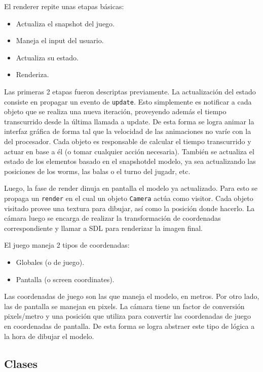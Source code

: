 El renderer repite unas etapas básicas:

\begin{itemize}
	\item Actualiza el snapshot del juego.
	\item Maneja el input del usuario.
	\item Actualiza su estado.
	\item Renderiza.
\end{itemize}

Las primeras 2 etapas fueron descriptas previamente. La actualización del estado consiste en propagar un evento de \texttt{update}.
Esto simplemente es notificar a cada objeto que se realiza una nueva iteración, proveyendo además el tiempo transcurrido desde
la última llamada a update. De esta forma se logra animar la interfaz gráfica de forma tal que la velocidad de las animaciones no
varíe con la del procesador. Cada objeto es responsable de calcular el tiempo transcurrido y actuar en base a él (o tomar cualquier
acción necesaria). También se actualiza el estado de los elementos basado en el snapshotdel modelo, ya sea actualizando las posiciones
de los worms, las balas o el turno del jugadr, etc.

Luego, la fase de render dinuja en pantalla el modelo ya actualizado. Para esto se propaga un \texttt{render} en el cual un objeto
\texttt{Camera} actúa como visitor. Cada objeto visitado provee una textura para dibujar, así como la posición donde hacerlo. La
cámara luego se encarga de realizar la transformación de coordenadas correspondiente y llamar a SDL para renderizar la imagen final.

El juego maneja 2 tipos de coordenadas:

\begin{itemize}
	\item Globales (o de juego).
	\item Pantalla (o screen coordinates).
\end{itemize}

Las coordenadas de juego son las que maneja el modelo, en metros. Por otro lado, las de pantalla se manejan en pixels. La cámara
tiene un factor de conversión pixels/metro y una posición que utiliza para convertir las coordenadas de juego en coordenadas
de pantalla. De esta forma se logra abstraer este tipo de lógica a la hora de dibujar el modelo.


\subsection{Clases}


